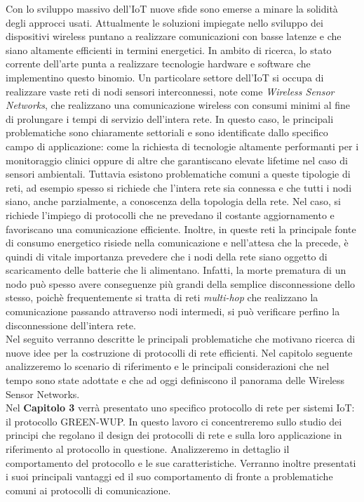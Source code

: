 \documentclass[binding=0.6cm,TFA]{sapthesis}
\begin{document}
Con lo sviluppo massivo dell'IoT nuove sfide sono emerse a minare la solidità degli approcci usati. Attualmente le soluzioni impiegate nello sviluppo
dei dispositivi wireless puntano a realizzare comunicazioni con basse latenze e che siano altamente efficienti in termini energetici. In ambito di ricerca,
lo stato corrente dell'arte punta a realizzare tecnologie hardware e software che implementino questo binomio. Un particolare
settore dell'IoT si occupa di realizzare vaste reti di nodi sensori interconnessi, note come \emph{Wireless Sensor Networks},
che realizzano una comunicazione wireless con consumi minimi al fine di prolungare i tempi di servizio dell'intera rete. In questo caso,
le principali problematiche sono chiaramente settoriali e sono identificate dallo specifico campo di applicazione: come la richiesta di tecnologie
altamente performanti per i monitoraggio clinici oppure di altre che garantiscano elevate lifetime nel caso di sensori ambientali. Tuttavia esistono
problematiche comuni a queste tipologie di reti, ad esempio spesso si richiede che l'intera rete sia connessa e che tutti i nodi siano,
anche parzialmente, a conoscenza della topologia della rete. Nel caso, si richiede l'impiego di protocolli che ne prevedano il
costante aggiornamento e favoriscano una comunicazione efficiente. Inoltre, in queste reti la principale fonte di consumo energetico risiede
nella comunicazione e nell'attesa che la precede, è quindi di vitale importanza prevedere che i nodi della rete siano
oggetto di scaricamento delle batterie che li alimentano. Infatti, la morte prematura di un nodo può spesso avere conseguenze più grandi della semplice
disconnessione dello stesso, poichè frequentemente si tratta di reti \emph{multi-hop} che realizzano la comunicazione passando attraverso nodi intermedi, si può
verificare perfino la disconnessione dell'intera rete.\\

Nel seguito verranno descritte le principali problematiche che motivano ricerca di nuove idee per la costruzione di protocolli di rete efficienti.
Nel capitolo seguente analizzeremo lo scenario di riferimento e le principali considerazioni che nel tempo sono state adottate e che ad oggi
definiscono il panorama delle Wireless Sensor Networks.\\

Nel \textbf{Capitolo 3} verrà presentato uno specifico protocollo di rete per sistemi IoT: il protocollo GREEN-WUP. In questo lavoro ci concentreremo sullo
studio dei principi che regolano il design dei protocolli di rete e sulla loro applicazione in riferimento al protocollo in questione. Analizzeremo
in dettaglio il comportamento del protocollo e le sue caratteristiche. Verranno inoltre presentati i suoi principali vantaggi ed il suo comportamento
di fronte a problematiche comuni ai protocolli di comunicazione.\\
\end{document}
